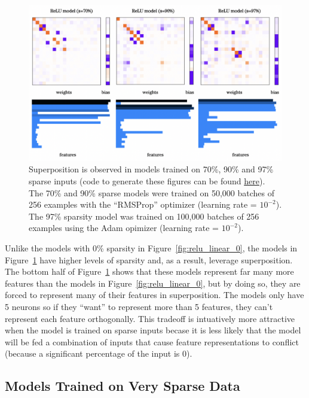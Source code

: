 \documentclass{article} %
\begin{document}
\begin{figure}[h]
    \centering
    \includegraphics[width=0.75\linewidth]{demonstrating_superposition/images/sparsity_superposition1.png}
    \captionsetup{font=footnotesize, width=0.71\linewidth} %
    \caption{
        Superposition is observed in models trained on 70\%, 90\% and 97\% 
        sparse inputs (code to generate these figures can be found 
        \href{https://github.com/zroe1/toy_models_of_superposition/blob/main/section_1/section_1.ipynb}{here}). 
        The 70\% and 90\% sparse models were trained on 50,000 batches of 256 
        examples with the ``RMSProp'' optimizer (learning rate = $10^{-2}$). The 
        97\% sparsity model was trained on 100,000 batches of 256 examples using 
        the Adam opimizer (learning rate = $10^{-2}$).
    }
    \label{fig:sparsity_1}
\end{figure}

Unlike the models with 0\% sparsity in Figure~\ref{fig:relu_linear_0}, the models
in Figure~\ref{fig:sparsity_1} have higher levels of sparsity and, as
a result, leverage superposition. The bottom half of Figure~\ref{fig:sparsity_1}
shows that these models represent far many more features than the models in
Figure~\ref{fig:relu_linear_0}, but by doing so, they are forced to represent many 
of their features in superposition. The models only have 5 neurons so if they 
``want'' to represent more than 5 features, they can't represent each feature 
orthogonally. This tradeoff is intuatively more attractive when the model is
trained on sparse inputs becase it is less likely that the model will be fed
a combination of inputs that cause feature representations to conflict (because
a significant percentage of the input is 0).


\subsection{Models Trained on Very Sparse Data}
\end{document}
